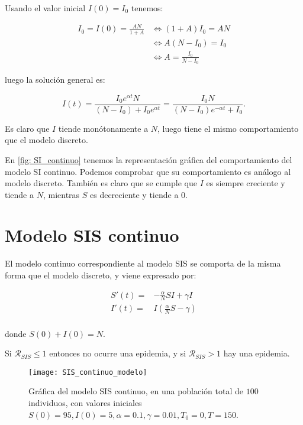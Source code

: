 Usando el valor inicial $I(0)=I_0$ tenemos:

\begin{equation}
\begin{aligned}
I_0 = I(0) = \frac{AN}{1+A} & \Leftrightarrow (1+A)I_0 = AN \\
& \Leftrightarrow A(N-I_0) = I_0 \\
& \Leftrightarrow A = \frac{I_0}{N-I_0}
\end {aligned}
\end{equation}

luego la solución general es:

$$I(t) = \frac{I_0e^{\alpha t}N}{(N-I_0)+I_0e^{\alpha t}} = \frac{I_0N}{(N-I_0)e^{-\alpha t}+I_0}.$$

Es claro que $I$ tiende monótonamente a $N$, luego tiene el mismo comportamiento que el modelo discreto.

En \eqref{fig: SI_continuo} tenemos la representación gráfica del comportamiento del modelo SI continuo. Podemos comprobar que su comportamiento es análogo al modelo discreto. También es claro que se cumple que $I$ es siempre creciente y tiende a $N$, mientras $S$ es decreciente y tiende a $0$.

\section{Modelo SIS continuo}

El modelo continuo correspondiente al modelo SIS se comporta de la misma forma que el modelo discreto, y viene expresado por:

\begin{equation}
\label{eqn: modelo_SIS_continuo}
\begin{aligned}
S'(t) = & -\frac{\alpha}{N}SI+\gamma I \\
I'(t) = & I\left( \frac{\alpha}{N}S-\gamma \right) \\
\end{aligned}
\end{equation}

donde $S(0)+I(0)=N$.

Si $\mathcal{R}_{SIS}\leq 1$ entonces no ocurre una epidemia, y si $\mathcal{R}_{SIS} > 1$ hay una epidemia.

\begin{figure}
\begin{center}
\caption{Gráfica del modelo SIS continuo, en una población total de $100$ individuos, con valores iniciales $S(0)=95, I(0) = 5, \alpha = 0.1, \gamma = 0.01, T_0 = 0, T = 150$.}
\label{fig: SIS_continuo}
\texttt{[image: SIS\_continuo\_modelo]}
\end{center}
\end{figure}


